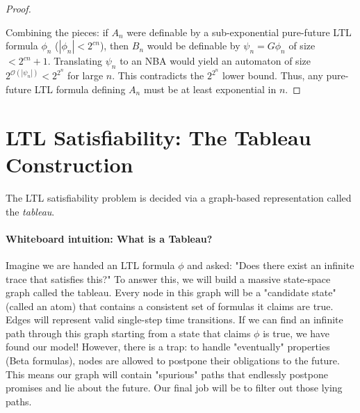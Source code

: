 \begin{proof}
\begin{center}
  \label{fig:run-merging-ex}
\end{center}

Combining the pieces: if $A_n$ were definable by a sub-exponential pure-future LTL formula $\phi_n$ ($|\phi_n| < 2^{cn}$), then $B_n$ would be definable by $\psi_n = G \phi_n$ of size $< 2^{cn} + 1$. Translating $\psi_n$ to an NBA would yield an automaton of size $2^{\mathcal{O}(|\psi_n|)} < 2^{2^n}$ for large $n$. This contradicts the $2^{2^n}$ lower bound. Thus, any pure-future LTL formula defining $A_n$ must be at least exponential in $n$.
\end{proof}

\section{LTL Satisfiability: The Tableau Construction}
\label{sec:ltl-tableau}

The LTL satisfiability problem is decided via a graph-based representation called the \emph{tableau}.

\paragraph{Whiteboard intuition: What is a Tableau?}
Imagine we are handed an LTL formula $\phi$ and asked: "Does there exist an infinite trace that satisfies this?" To answer this, we will build a massive state-space graph called the tableau. Every node in this graph will be a "candidate state" (called an atom) that contains a consistent set of formulas it claims are true. Edges will represent valid single-step time transitions.
If we can find an infinite path through this graph starting from a state that claims $\phi$ is true, we have found our model! However, there is a trap: to handle "eventually" properties (Beta formulas), nodes are allowed to postpone their obligations to the future. This means our graph will contain "spurious" paths that endlessly postpone promises and lie about the future. Our final job will be to filter out those lying paths.

